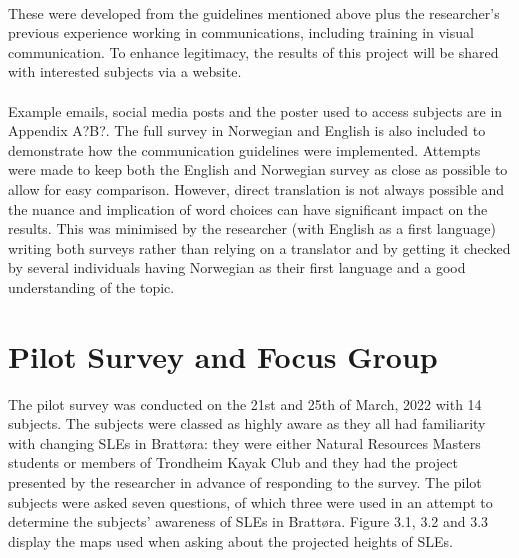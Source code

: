 \paragraph{}
These were developed from the guidelines mentioned above plus the researcher's previous experience working in communications, including training in visual communication. To enhance legitimacy, the results of this project will be shared with interested subjects via a website.
\paragraph{}
Example emails, social media posts and the poster used to access subjects are in Appendix A?B?. The full survey in Norwegian and English is also included to demonstrate how the communication guidelines were implemented. Attempts were made to keep both the English and Norwegian survey as close as possible to allow for easy comparison. However, direct translation is not always possible and the nuance and implication of word choices can have significant impact on the results. This was minimised by the researcher (with English as a first language) writing both surveys rather than relying on a translator and by getting it checked by several individuals having Norwegian as their first language and a good understanding of the topic.

\section{Pilot Survey and Focus Group}

The pilot survey was conducted on the 21st and 25th of March, 2022 with 14 subjects. The subjects were classed as highly aware as they all had familiarity with changing SLEs in Brattøra: they were either Natural Resources Masters students or members of Trondheim Kayak Club and they had the project presented by the researcher in advance of responding to the survey. The pilot subjects were asked seven questions, of which three were used in an attempt to determine the subjects' awareness of SLEs in Brattøra. Figure 3.1, 3.2 and 3.3 display the maps used when asking about the projected heights of SLEs.


